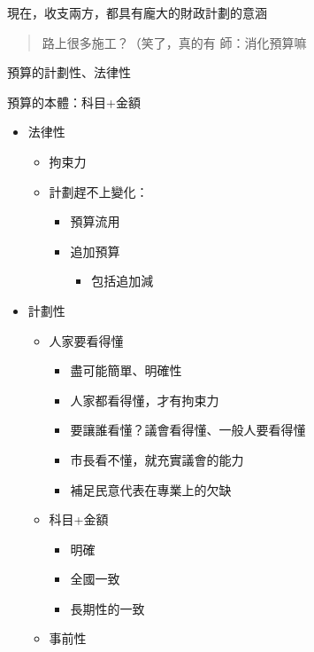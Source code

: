\documentclass[]{book}
\providecommand{\tightlist}{%
  \setlength{\itemsep}{0pt}\setlength{\parskip}{0pt}}
\begin{document}
現在，收支兩方，都具有龐大的財政計劃的意涵

\begin{quote}
路上很多施工？（笑了，真的有
師：消化預算嘛
\end{quote}

預算的計劃性、法律性

預算的本體：科目+金額

\begin{itemize}
\tightlist
\item
  法律性

  \begin{itemize}
  \tightlist
  \item
    拘束力
  \item
    計劃趕不上變化：

    \begin{itemize}
    \tightlist
    \item
      預算流用
    \item
      追加預算

      \begin{itemize}
      \tightlist
      \item
        包括追加減
      \end{itemize}
    \end{itemize}
  \end{itemize}
\item
  計劃性

  \begin{itemize}
  \tightlist
  \item
    人家要看得懂

    \begin{itemize}
    \tightlist
    \item
      盡可能簡單、明確性
    \item
      人家都看得懂，才有拘束力
    \item
      要讓誰看懂？議會看得懂、一般人要看得懂
    \item
      市長看不懂，就充實議會的能力
    \item
      補足民意代表在專業上的欠缺
    \end{itemize}
  \item
    科目+金額

    \begin{itemize}
    \tightlist
    \item
      明確
    \item
      全國一致
    \item
      長期性的一致
    \end{itemize}
  \item
    事前性
  \end{itemize}
\end{itemize}
\end{document}
